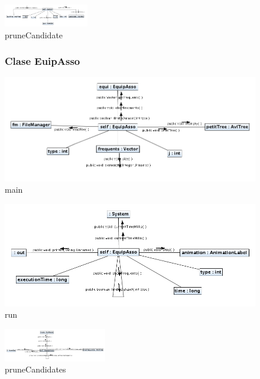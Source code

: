 \newpage
\begin{figure}
\centering
\includegraphics[angle=90, width=0.33\textwidth]{imgsColaboracion/Apriori/pruneCandidate.png}
\caption{pruneCandidate}
\end{figure}
\newpage
\begin{figure}
\subsubsection{Clase EuipAsso}
\centering
\includegraphics[width=1.2\textwidth]{imgsColaboracion/EuipAsso/EquipAsso/main.png}
\caption{main}
\end{figure}
\newpage
\begin{figure}
\centering
\includegraphics[width=1.2\textwidth]{imgsColaboracion/EuipAsso/EquipAsso/run.png}
\caption{run}
\end{figure}
\newpage
\begin{figure}
\centering
\includegraphics[angle=90,width=0.4\textwidth]{imgsColaboracion/EuipAsso/EquipAsso/pruneCandidates.png}
\caption{pruneCandidates}
\end{figure}
